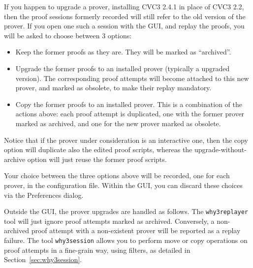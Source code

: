 If you happen to upgrade a prover, \eg installing CVC3 2.4.1 in place
of CVC3 2.2, then the proof sessions formerly recorded will still
refer to the old version of the prover. If you open one such a session
with the GUI, and replay the proofs, you will be asked to choose
between 3 options:
\begin{itemize}
\item Keep the former proofs as they are. They will be marked as
  ``archived''.
\item Upgrade the former proofs to an installed prover (typically a
  upgraded version). The corresponding proof attempts will become
  attached to this new prover, and marked as obsolete, to make their
  replay mandatory.
\item Copy the former proofs to an installed prover. This is a
  combination of the actions above: each proof attempt is duplicated,
  one with the former prover marked as archived, and one for the new
  prover marked as obsolete.
\end{itemize}

Notice that if the prover under consideration is an interactive one, then
the copy option will duplicate also the edited proof scripts, whereas
the upgrade-without-archive option will just reuse the former proof scripts.

Your choice between the three options above will be recorded, one for
each prover, in the \why configuration file. Within the GUI, you can
discard these choices via the \textsf{Preferences} dialog.

Outside the GUI, the prover upgrades are handled as follows. The
\texttt{why3replayer} tool will just ignore proof attempts marked as
archived. Conversely, a non-archived proof attempt with a non-existent
prover will be reported as a replay failure. The tool
\texttt{why3session} allows you to perform move or copy operations on
proof attempts in a fine-grain way, using filters, as detailed in
Section~\ref{sec:why3session}.





